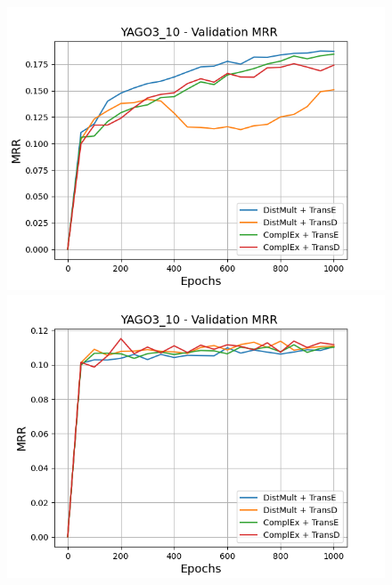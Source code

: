 \begin{figure}[H]
    \centering
    \begin{minipage}{.45\textwidth}
      \centering
      \includegraphics[width=0.9\linewidth]{figures/results/gan_train/not_pretrained/random/yago3_10/1k_epochs/random_yago3_10_mrrs.png}
    \end{minipage}%
    \begin{minipage}{.45\textwidth}
      \centering
      \includegraphics[width=0.9\linewidth]{figures/results/gan_train/not_pretrained/uncertainty/max_distribution/entropy/yago3_10/1k_epochs/uncertainty_yago3_10_mrrs.png}
    \end{minipage}
    \begin{minipage}{.45\textwidth}
      \centering

\end{minipage}
\end{figure}
